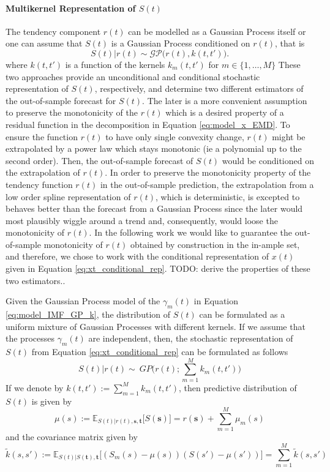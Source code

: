 \paragraph{Multikernel Representation of $S(t)$}
The tendency component $r(t)$ can be modelled as a Gaussian Process itself or one can assume that $S(t)$ is a Gaussian Process conditioned on $r(t)$, that is
\begin{equation}\label{eq:xt_conditional_rep}
S(t) | r(t) \sim \mathcal{GP} \Big(r(t),  k(t,t')  \Big).
\end{equation}
where $k(t,t')$ is a function of the kernels $k_m(t,t')$ for $m \in \big\{1,\ldots,M \big\}$
These two approaches provide an unconditional and conditional stochastic representation of $S(t)$, respectively, and determine two different estimators of the out-of-sample forecast for $S(t)$.  The later is a more convenient assumption to preserve the monotonicity of the $r(t)$ which is a desired property of a residual function in the decomposition in Equation \eqref{eq:model_x_EMD}.  To ensure the function $r(t)$ to have only single convexity change, $r(t)$ might be extrapolated by a power law which stays monotonic (ie a polynomial up to the second order). Then, the out-of-sample forecast of $S(t)$ would be conditioned on the extrapolation of $r(t)$.  In order to preserve the monotonicity property of the tendency function $r(t)$ in the out-of-sample prediction, the extrapolation from a low order spline representation of $r(t)$, which is deterministic,  is excepted to behaves better than the forecast from a Gaussian Process since the later would most plausibly wiggle around a trend and, consequently, would loose the monotonicity of $r(t)$.  In the following work we would like to guarantee the out-of-sample monotonicity of $r(t)$ obtained by construction in the in-ample set,  and therefore, we chose to work with the conditional representation of $x(t)$ given in Equation \eqref{eq:xt_conditional_rep}.  {\color{red} TODO: derive the properties of these two estimators.}.


Given the Gaussian Process model of the $\gamma_m(t)$ in Equation \eqref{eq:model_IMF_GP_k}, the distribution of $S(t)$ can be formulated as a uniform mixture of Gaussian Processes with different kernels.  If we assume that the processes $\gamma_m(t)$ are independent, then, the stochastic representation of $S(t)$ from Equation \eqref{eq:xt_conditional_rep} can be formulated as follows
\begin{equation}
S(t)|r(t) \sim ~   GP \bigg(r(t); \sum_{m=1}^M k_m(t,t') \bigg)
\end{equation}
If we denote by $k(t,t') := \sum_{m=1}^M k_m(t,t')$, then predictive distribution of $S(t)$ is given by
\begin{equation}
\mu(s):= \mathbb{E}_{S(t)| r(t), \mathbf{s},\mathbf{t}} \big[S(\mathbf{s})] =  r(\mathbf{s}) + \sum_{m = 1}^M \mu_m(s)
\end{equation}
and the covariance matrix given by
\begin{equation}
\tilde{k}(s,s'):= \mathbb{E}_{S(t)|S(\mathbf{t}), \mathbf{t}} \bigg[(S_m(s) - \mu(s))(S(s') - \mu(s'))\bigg] = \sum_{m = 1}^M \tilde{k}(s,s')
\end{equation}

